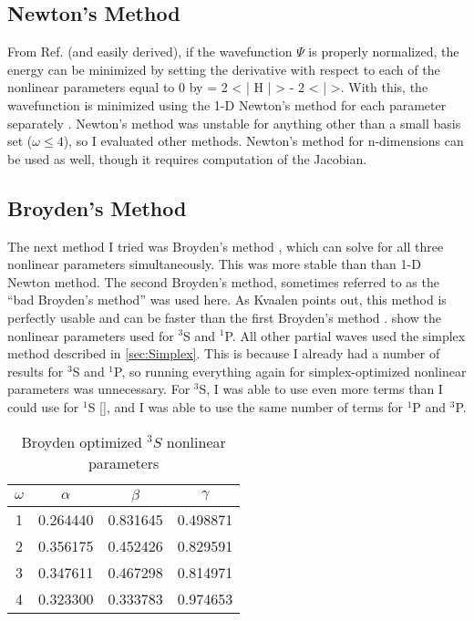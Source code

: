 \documentclass[Dissertation.tex]{subfiles}
\begin{document}
\subsection{Newton's Method}
\label{sec:Newton}
From Ref. \cite{Yan1999} (and easily derived), if the wavefunction $\Psi$ is properly normalized, the energy can be minimized by setting the derivative with respect to each of the nonlinear parameters equal to 0 by
\beq
{} = 2 \left< \Psi \Big| H \Big| \frac{\partial\Psi}{\partial \alpha} \right> - 2 \left< \Psi \Big| \frac{\partial\Psi}{\partial \alpha} \right>.
\label{eq:EnergyDerivativeNorm}
\eeq
With this, the wavefunction is minimized using the 1-D Newton's method for each parameter separately \cite{Sauer2006}. Newton's method was unstable for anything other than a small basis set ($\omega \leq 4$), so I evaluated other methods. Newton's method for n-dimensions can be used as well, though it requires computation of the Jacobian.

\subsection{Broyden's Method}
\label{sec:Broyden}
The next method I tried was Broyden's method \cite{Sauer2006}, which can solve for all three nonlinear parameters simultaneously. This was more stable than than 1-D Newton method. The second Broyden's method, sometimes referred to as the ``bad Broyden's method'' was used here. As Kvaalen points out, this method is perfectly usable and can be faster than the first Broyden's method \cite{Kvaalen1991}.  show the nonlinear parameters used for $^3$S and $^1$P. All other partial waves used the simplex method described in \cref{sec:Simplex}. This is because I already had a number of results for $^3$S and $^1$P, so running everything again for simplex-optimized nonlinear parameters was unnecessary. For $^3$S, I was able to use even more terms than I could use for $^1$S \cref{}, and I was able to use the same number of terms for $^1$P and $^3$P.

\setlength{\abovecaptionskip}{6pt}   %
\setlength{\belowcaptionskip}{6pt}   %
\begin{table}[H]
\centering
\begin{tabular}{c c c c}
\toprule
$\omega$ & $\alpha$ & $\beta$ & $\gamma$ \\ [0.5ex]
\midrule
1 & 0.264440 & 0.831645 & 0.498871 \\
2 & 0.356175 & 0.452426 & 0.829591 \\
3 & 0.347611 & 0.467298 & 0.814971 \\
4 & 0.323300 & 0.333783 & 0.974653 \\
\bottomrule
\end{tabular}
\caption{Broyden optimized $^3S$ nonlinear parameters}
\label{table:NonlinearOptimized3SBroyden}
\end{table}
\end{document}
